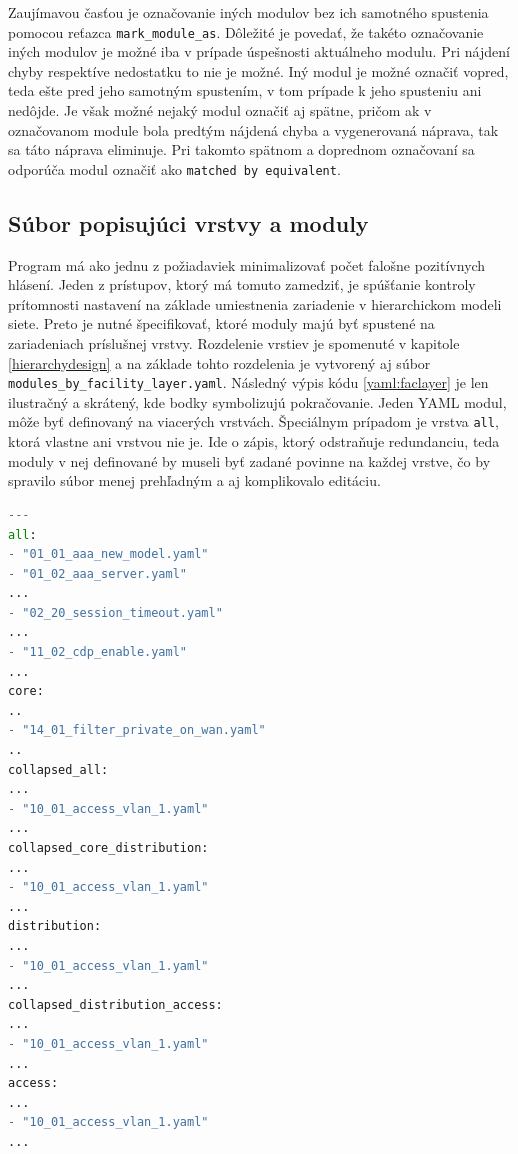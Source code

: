 Zaujímavou časťou je označovanie iných modulov bez ich samotného spustenia pomocou reťazca \texttt{mark\_module\_as}. Dôležité je povedať, že takéto označovanie iných modulov je možné iba v prípade úspešnosti aktuálneho modulu. Pri nájdení chyby respektíve nedostatku to nie je možné. Iný modul je možné označiť vopred, teda ešte pred jeho samotným spustením, v tom prípade k jeho spusteniu ani nedôjde. Je však možné nejaký modul označiť aj spätne, pričom ak v označovanom module bola predtým nájdená chyba a vygenerovaná náprava, tak sa táto náprava eliminuje. Pri takomto spätnom a doprednom označovaní sa odporúča modul označiť ako \texttt{matched by equivalent}.

\newpage
\subsection{Súbor popisujúci vrstvy a moduly}
Program má ako jednu z požiadaviek minimalizovať počet falošne pozitívnych hlásení. Jeden z prístupov, ktorý má tomuto zamedziť, je spúšťanie kontroly prítomnosti nastavení  na základe umiestnenia zariadenie v hierarchickom modeli siete. Preto je nutné špecifikovať, ktoré moduly majú byť spustené na zariadeniach príslušnej vrstvy. Rozdelenie vrstiev je spomenuté v kapitole \ref{hierarchydesign} a na základe tohto rozdelenia je vytvorený aj súbor \texttt{modules\_by\_facility\_layer.yaml}. Následný výpis kódu \ref{yaml:faclayer} je len ilustračný a skrátený, kde bodky symbolizujú pokračovanie. Jeden YAML modul, môže byť definovaný na viacerých vrstvách. Špeciálnym prípadom je vrstva \texttt{all}, ktorá vlastne ani vrstvou nie je. Ide o zápis, ktorý odstraňuje redundanciu, teda moduly v nej definované by museli byť zadané povinne na každej vrstve, čo by spravilo súbor menej prehľadným a aj komplikovalo editáciu.

\begin{lstlisting}[frame=single,numbers=right,caption={Ukážka skráteného príkladu skráteného konfiguračného súboru \texttt{modules\_by\_facility\_layer.yaml}, ktorý popisuje, aké moduly môžu byť spúšťané na jednotlivých vrstvách.},label=yaml:faclayer,basicstyle=\ttfamily\small, keywordstyle=\color{black},language=python,breaklines=true]
---
all:
- "01_01_aaa_new_model.yaml"
- "01_02_aaa_server.yaml"
...
- "02_20_session_timeout.yaml"
...
- "11_02_cdp_enable.yaml"
...
core: 
..
- "14_01_filter_private_on_wan.yaml"
..
collapsed_all:
...
- "10_01_access_vlan_1.yaml"
...
collapsed_core_distribution:
...
- "10_01_access_vlan_1.yaml"
...
distribution: 
...
- "10_01_access_vlan_1.yaml"
...
collapsed_distribution_access:
...
- "10_01_access_vlan_1.yaml"
...
access: 
...
- "10_01_access_vlan_1.yaml"
...

\end{lstlisting}

